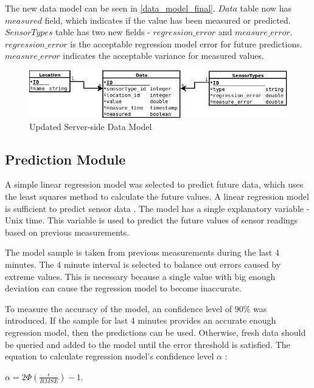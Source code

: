 The new data model can be seen in \autoref{data_model_final}. $Data$ table now has $measured$ field, which indicates if the value has been measured or predicted. $SensorTypes$ table has two new fields - $regression\_error$ and $measure\_error$. $regression\_error$ is the acceptable regression model error for future predictions. $measure\_error$ indicates the acceptable variance for measured values. 

\begin{figure}[h!]
\centering
\includegraphics[scale=0.6]{4/figures/data_model_final.jpg}
\caption{Updated Server-side Data Model}
\label{data_model_final}
\end{figure}

\subsection{Prediction Module}

A simple linear regression model was selected to predict future data, which uses the least squares method to calculate the future values. A linear regression model is sufficient to predict sensor data \cite[p. 1066]{cluster_wsn_paper}. The model has a single explanatory variable - Unix time. This variable is used to predict the future values of sensor readings based on previous measurements. 

The model sample is taken from previous measurements during the last 4 minutes. The 4 minute interval is selected to balance out errors caused by extreme values. This is necessary because a single value with big enough deviation can cause the regression model to become inaccurate. 

To measure the accuracy of the model, an confidence level of 90\% was introduced. If the sample for last 4 minutes provides an accurate enough regression model, then the predictions can be used. Otherwise, fresh data should be queried and added to the model until the error threshold is satisfied. The equation to calculate regression model's confidence level $\alpha$ \cite[p. 1066]{cluster_wsn_paper}:\\

\begin{center}
$\alpha = 2\Phi \left ( \frac{\epsilon}{RMSE}  \right ) - 1$.
\end{center}

